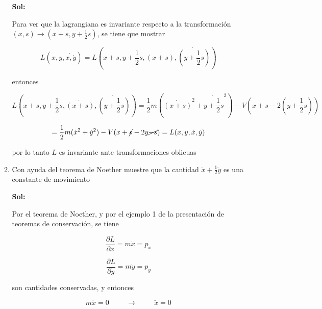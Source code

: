 \documentclass[12pt,a4paper]{article}
\begin{document}
\begin{enumerate}
\begin{enumerate}
            \textbf{Sol:}
            
            Para ver que la lagrangiana es invariante respecto a la transformación $(x,s) \rightarrow (x+s,y+\frac{1}{2}s)$, se tiene que mostrar
            
            \begin{equation*}
                L(x,y,\dot{x,\dot{y}}) = L(x+s,y+\frac{1}{2}s, \dot{(x+s)},\dot{(y+\frac{1}{2}s)})
            \end{equation*}
            
            entonces
            
            \begin{equation*}
                L(x+s,y+\frac{1}{2}s, \dot{(x+s)},\dot{(y+\frac{1}{2}s)}) =\frac{1}{2}m (\dot{(x+s)}^2 + \dot{y+\frac{1}{2}s}^2) - V(x+s - 2(y + \frac{1}{2}s))
            \end{equation*}
            
            \begin{equation*}
                =\frac{1}{2} m (\dot{x}^2 + \dot{y}^2)  - V(x+\cancel{s}-2y\cancel{-s}) = L(x,y,\dot{x},\dot{y})
            \end{equation*}
            
            por lo tanto $L$ es invariante ante transformaciones oblicuas
            
            
            \item Con ayuda del teorema de Noether muestre que la cantidad $\dot{x} + \frac{1}{2} \dot{y}$ es una constante de movimiento
            
            \textbf{Sol:}
            
            Por el teorema de Noether, y por el ejemplo 1 de la presentación de teoremas de conservación, se tiene
            
            \begin{equation*}
                \frac{\partial L}{\partial \dot{x}} = m\dot{x}= p_x
            \end{equation*}
            
            \begin{equation*}
                \frac{\partial L}{\partial \dot{y}} = m\dot{y} = p_y
            \end{equation*}
            
            son cantidades conservadas, y entonces
            
            \begin{equation*}
                m\ddot{x} = 0 \hspace{1cm} \rightarrow \hspace{1cm} \ddot{x} = 0
            \end{equation*}
            

\end{enumerate}
\end{enumerate}
\end{document}
